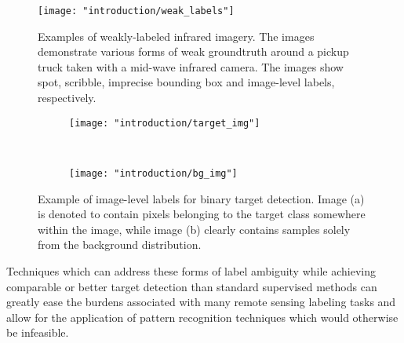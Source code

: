 \begin{center}
	\begin{figure*}[h]
		\centering
		\texttt{[image: "introduction/weak\_labels"]}
		\caption{Examples of weakly-labeled infrared imagery.  The images demonstrate various forms of weak groundtruth around a pickup truck taken with a mid-wave infrared camera.  The images show spot, scribble, imprecise bounding box and image-level labels, respectively.}
		\label{fig:weak_labels}
	\end{figure*}
\end{center}


\begin{figure*}[t!]
	\centering
	\begin{subfigure}[t]{0.5\textwidth}
		\centering
		\texttt{[image: "introduction/target\_img"]}
		\caption{}
	\end{subfigure}%
	~ 
	\begin{subfigure}[t]{0.5\textwidth}
		\centering
		\texttt{[image: "introduction/bg\_img"]}
		\caption{}
	\end{subfigure}
	\caption{Example of image-level labels for binary target detection.  Image (a) is denoted to contain pixels belonging to the target class somewhere within the image, while image (b) clearly contains samples solely from the background distribution.}
	\label{fig:binary_targets}%
\end{figure*}

Techniques which can address these forms of label ambiguity while achieving comparable or better target detection than standard supervised methods can greatly ease the burdens associated with many remote sensing labeling tasks and allow for the application of pattern recognition techniques which would otherwise be infeasible.

